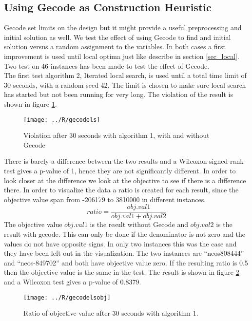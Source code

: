 \subsection{Using Gecode as Construction Heuristic}
Gecode set limits on the design but it might provide a useful preprocessing and initial solution as well. We test 
the effect of using Gecode to find and initial solution versus a random assignment to the variables. In both cases a 
first improvement is used until local optima just like describe in section \ref{sec_local}. Two test on 46 instances 
has been made to test the effect of Gecode. \\ 
The first test algorithm 2, Iterated local search, is used until a total time limit of 30 seconds, with a random seed 
$42$. The limit is chosen to make sure local search has started but not been running for very long. The violation of 
the result is shown in figure \ref{fig_gecodels}. 
\begin{figure}[!h]
\centering
\texttt{[image: ../R/gecodels]} \caption{Violation after 30 seconds with 
algorithm 1, with and without Gecode}\label{fig_gecodels}
\end{figure}\noindent
There is barely a difference between the two results and a Wilcoxon signed-rank test gives a p-value of 1, hence they 
are not significantly different. In order to look closer at the difference we look at the objective to see if there is 
a difference there. In order to visualize the data a ratio is created for each result, since the objective value span
from -206179 to 3810000 in different instances. 
\begin{equation}
 ratio = \frac{obj.val1}{obj.val1+obj.val2}
\end{equation}
The objective value $obj.val1$ is the result without Gecode and $obj.val2$ is the result with gecode. This can only 
be done if the denominator is not zero and the values do not have opposite signs. In only two instances this was the 
case and they have been left out in the visualization. The two instances are ``neos808444'' and ``neos-849702'' and 
both have objective value zero. If the resulting ratio is 0.5 then the objective value is the same in the test. The 
result is shown in figure \ref{fig_gecodelsobj} and a Wilcoxon test gives a p-value of 0.8379. 
\begin{figure}[!h]
\centering
\texttt{[image: ../R/gecodelsobj]} \caption{Ratio of objective value after 30 seconds with 
algorithm 1.}\label{fig_gecodelsobj}
\end{figure}\noindent
